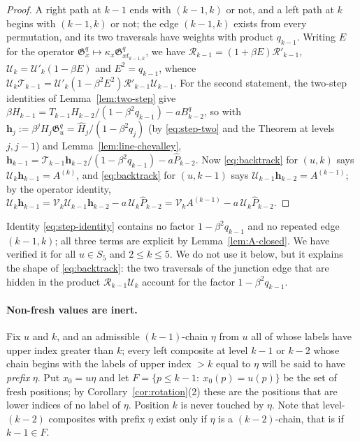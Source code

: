 \documentclass[11pt]{article}
\newcommand{\G}{\mathfrak{G}}
\begin{document}
\begin{proof}
A right path at $k-1$ ends with $(k-1,k)$ or not, and a left path at
$k$ begins with $(k-1,k)$ or not; the edge $(k-1,k)$ exists from every
permutation, and its two traversals have weights with product
$q_{k-1}$. Writing $E$ for the operator $\G^q_x\mapsto\kappa_x\G^q_{xt_{k-1,k}}$,
we have $\mathcal R_{k-1}=(1+\beta E)\mathcal R'_{k-1}$,
$\mathcal U_k=\mathcal U'_k(1-\beta E)$ and $E^2=q_{k-1}$, whence
$\mathcal U_k\mathcal T_{k-1}=\mathcal U'_k(1-\beta^2E^2)\mathcal R'_{k-1}\mathcal U_{k-1}$.
For the second statement, the two-step identities of
Lemma~\ref{lem:two-step} give
$\beta H_{k-1}=T_{k-1}H_{k-2}/(1-\beta^2q_{k-1})-aB^q_{k-2}$, so with
$\mathbf h_j:=\beta^jH_j\G^q_u=\widehat H_j/(1-\beta^2q_j)$ (by
\eqref{eq:step-two} and the Theorem at levels $j,j-1$) and
Lemma~\ref{lem:line-chevalley},
$\mathbf h_{k-1}=\mathcal T_{k-1}\mathbf h_{k-2}/(1-\beta^2q_{k-1})-a\widehat P_{k-2}$.
Now \eqref{eq:backtrack} for $(u,k)$ says
$\mathcal U_k\mathbf h_{k-1}=A^{(k)}$, and \eqref{eq:backtrack} for
$(u,k-1)$ says $\mathcal U_{k-1}\mathbf h_{k-2}=A^{(k-1)}$; by the
operator identity,
$\mathcal U_k\mathbf h_{k-1}=\mathcal V_k\mathcal U_{k-1}\mathbf h_{k-2}-a\,\mathcal U_k\widehat P_{k-2}
=\mathcal V_kA^{(k-1)}-a\,\mathcal U_k\widehat P_{k-2}$.
\end{proof}

Identity \eqref{eq:step-identity} contains no factor
$1-\beta^2q_{k-1}$ and no repeated edge $(k-1,k)$; all three terms are
explicit by Lemma~\ref{lem:A-closed}. We have verified it for all
$u\in S_5$ and $2\leq k\leq5$. We do not use it below, but it
explains the shape of \eqref{eq:backtrack}: the two traversals of the
junction edge that are hidden in the product
$\mathcal R_{k-1}\mathcal U_k$ account for the factor
$1-\beta^2q_{k-1}$.

\paragraph{Non-fresh values are inert.}
Fix $u$ and $k$, and an admissible $(k-1)$-chain $\eta$ from $u$ all
of whose labels have upper index greater than $k$; every left
composite at level $k-1$ or $k-2$ whose chain begins with the labels
of upper index $>k$ equal to $\eta$ will be said to have
\emph{prefix} $\eta$. Put $x_0=u\eta$ and let
$F=\{p\leq k-1:\ x_0(p)=u(p)\}$ be the set of fresh positions; by
Corollary~\ref{cor:rotation}(2) these are the positions that are lower
indices of no label of $\eta$. Position $k$ is never touched by
$\eta$. Note that level-$(k-2)$ composites with prefix $\eta$ exist
only if $\eta$ is a $(k-2)$-chain, that is if $k-1\in F$.
\end{document}
